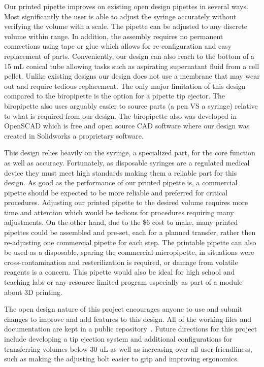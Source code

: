 \documentclass[10pt,letterpaper]{article}
\begin{document}
Our printed pipette improves on existing open design pipettes in several ways. 
Most significantly the user is able to adjust the syringe accurately without verifying the volume with a scale.
The pipette can be adjusted to any discrete volume within range.
In addition, the assembly requires no permanent connections using tape or glue which allows for re-configuration and easy replacement of parts.
Conveniently, our design can also reach to the bottom of a 15 mL conical tube allowing tasks such as aspirating supernatant fluid from a cell pellet.
Unlike existing designs our design does not use a membrane that may wear out and require tedious replacement.
The only major limitation of this design compared to the biropipette is the option for a pipette tip ejector.
The biropipette also uses arguably easier to source parts (a pen VS a syringe) relative to what is required from our design.
The biropipette also was developed in OpenSCAD which is free and open source CAD software where our design was created in Solidworks a proprietary software. 
 
This design relies heavily on the syringe, a specialized part, for the core function as well as accuracy.
Fortunately, as disposable syringes are a regulated medical device they must meet high standards making them a reliable part for this design.
As good as the performance of our printed pipette is, a commercial pipette should be expected to be more reliable and preferred for critical procedures. 
Adjusting our printed pipette to the desired volume requires more time and attention which would be tedious for procedures requiring many adjustments.
On the other hand, due to the \$6 cost to make, many printed pipettes could be assembled and pre-set, each for a planned transfer, rather then re-adjusting one commercial pipette for each step.
The printable pipette can also be used as a disposable, sparing the commercial micropipette, in situations were cross-contamination and resterilization is required, or damage from volatile reagents is a concern.
This pipette would also be ideal for high school and teaching labs or any resource limited program especially as part of a module about 3D printing.

The open design nature of this project encourages anyone to use and submit changes to improve and add features to this design.
All of the working files and documentation are kept in a public repository~\cite{BMLmicropipette}.
Future directions for this project include developing a tip ejection system and additional configurations for transferring volumes below 30 uL as well as increasing over all user friendliness, such as making the adjusting bolt easier to grip and improving ergonomics.
\end{document}
